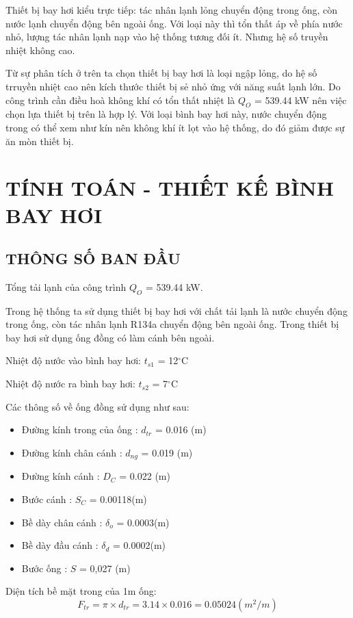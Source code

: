 Thiết bị bay hơi kiểu trực tiếp: tác nhân lạnh lỏng chuyển động trong ống, còn nước lạnh chuyển động bên ngoài ống. Với loại này thì tổn thất áp về phía nước nhỏ, lượng tác nhân lạnh nạp vào hệ thống tương đối ít. Nhưng hệ số truyền nhiệt không cao.

Từ sự phân tích ở trên ta chọn thiết bị bay hơi là loại ngập lỏng, do hệ số trruyền nhiệt cao nên kích thước thiết bị sẻ nhỏ ứng với năng suất lạnh lớn. Do công trình cần điều hoà không khí có tổn thất nhiệt là $Q_{O}$ = 539.44 kW nên việc chọn lựa thiết bị trên là hợp lý. Với loại bình bay hơi này, nước chuyển động trong có thể xem như kín nên không khí ít lọt vào hệ thống, do đó giảm được sự ăn mòn thiết bị.

\section{TÍNH TOÁN - THIẾT KẾ BÌNH BAY HƠI}
\subsection{THÔNG SỐ BAN ĐẦU}
Tổng tải lạnh của công trình $Q_{O}$ = 539.44 kW.

Trong hệ thống ta sử dụng thiết bị bay hơi với chất tải lạnh là nước chuyển động trong ống, còn tác nhân lạnh R134a chuyển động bên ngoài ống. Trong thiết bị bay hơi sử dụng ống đồng có làm cánh bên ngoài.

Nhiệt độ nước vào bình bay hơi: $t_{s1}$ = 12$^{\circ}$C

Nhiệt độ nước ra bình bay hơi: $t_{s2}$ = 7$^{\circ}$C

Các thông số về ống đồng sử dụng như sau:
\begin{itemize}
	\item Đường kính trong của ống : $ d_{tr} $ = 0.016 (m)
	\item Đường kính chân cánh : $ d_{ng} $ = 0.019 (m)
	\item Đường kính cánh : $D_{C}$ = 0.022 (m)
	\item Bước cánh : $ S_{C} $ =  0.00118(m)
	\item Bề dày chân cánh : $ \delta_{o} $ = 0.0003(m) 
	\item Bề dày đầu cánh : $ \delta_{d} $ = 0.0002(m)
	\item Bước ống : $S$ = 0,027 (m)
\end{itemize}

Diện tích bề mặt trong của 1m ống:
\begin{equation*}
	F_{tr} = \pi\times d_{tr} = 3.14 \times 0.016 = 0.05024(m^2/m)
\end{equation*}

